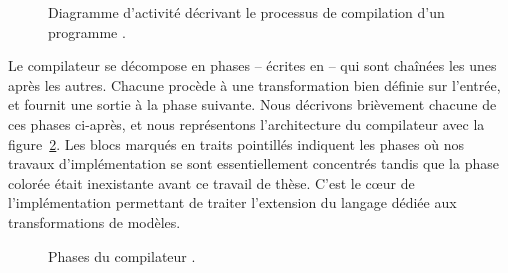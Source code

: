 %
%

\begin{figure}[H]
  \begin{center}
    
  \end{center}
  \caption{Diagramme d'activité décrivant le processus de compilation d'un programme {\tom}.}
  \label{fig:wholeTomProcess}
\end{figure}

%
% 

Le compilateur {\tom} se décompose en phases -- écrites en {\tomjava} -- qui
sont chaînées les unes après les autres. Chacune procède à une transformation
bien définie sur l'entrée, et fournit une sortie à la phase suivante. Nous
décrivons brièvement chacune de ces phases ci-après, et nous représentons
l'architecture du compilateur {\tom} avec la figure~\ref{fig:tomArchi}. Les
blocs marqués en traits pointillés indiquent les phases où nos travaux
d'implémentation se sont essentiellement concentrés tandis que la phase colorée
était inexistante avant ce travail de thèse. C'est le cœur de
l'implémentation permettant de traiter l'extension du langage dédiée aux
transformations de modèles.

\begin{figure}[h]
  \begin{center}
    
  \end{center}
  \caption{Phases du compilateur {\tom}.}
  \label{fig:tomArchi}
\end{figure}

